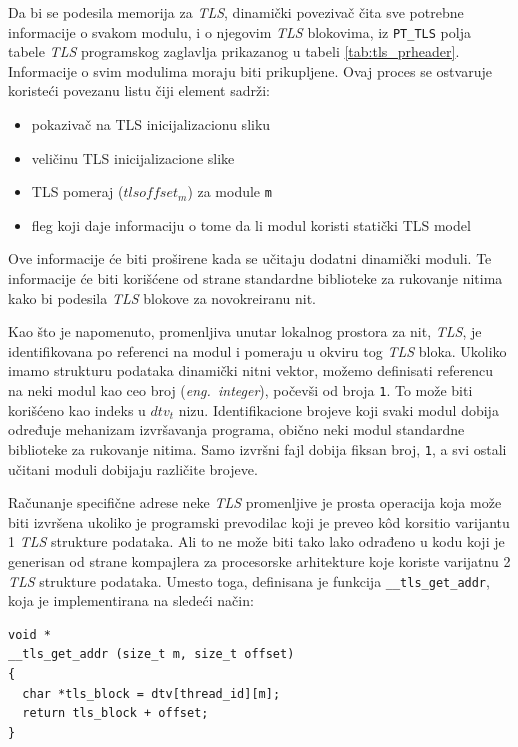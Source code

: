 \documentclass[12pt,oneside]{memoir}
\begin{document}
Da bi se podesila memorija za \emph{TLS}, dinamički povezivač čita sve potrebne informacije o svakom modulu, i o njegovim \emph{TLS} blokovima, iz \texttt{PT\_TLS} polja tabele \emph{TLS} programskog zaglavlja prikazanog u tabeli \ref{tab:tls_prheader}. Informacije o svim modulima moraju biti prikupljene. Ovaj proces se ostvaruje koristeći povezanu listu čiji element sadrži:

\begin{itemize}
	\item pokazivač na TLS inicijalizacionu sliku
	\item veličinu TLS inicijalizacione slike
	\item TLS pomeraj (\texttt{$tlsoffset_m$}) za module \texttt{m}
	\item fleg koji daje informaciju o tome da li modul koristi statički TLS model
\end{itemize}

Ove informacije će biti proširene kada se učitaju dodatni dinamički moduli. Te informacije će biti korišćene od strane standardne biblioteke za rukovanje nitima kako bi podesila \emph{TLS} blokove za novokreiranu nit.

Kao što je napomenuto, promenljiva unutar lokalnog prostora za nit, \emph{TLS}, je identifikovana po referenci na modul i pomeraju u okviru tog \emph{TLS} bloka. Ukoliko imamo strukturu podataka dinamički nitni vektor, možemo definisati referencu na neki modul kao ceo broj (\emph{eng.~integer}), počevši od broja \texttt{1}. To može biti korišćeno kao indeks u \texttt{$dtv_t$} nizu. Identifikacione brojeve koji svaki modul dobija određuje mehanizam izvršavanja programa, obično neki modul standardne biblioteke za rukovanje nitima. Samo izvršni fajl dobija fiksan broj, \texttt{1}, a svi ostali učitani moduli dobijaju različite brojeve.

Računanje specifične adrese neke \emph{TLS} promenljive je prosta operacija koja može biti izvršena ukoliko je programski prevodilac koji je preveo k\^{o}d korsitio varijantu 1 \emph{TLS} strukture podataka. Ali to ne može biti tako lako odrađeno u kodu koji je generisan od strane kompajlera za procesorske arhitekture koje koriste varijatnu 2 \emph{TLS} strukture podataka.
Umesto toga, definisana je funkcija \texttt{\_\_tls\_get\_addr}, koja je implementirana na sledeći način:

\begin{lstlisting}[style=customc]
void *
__tls_get_addr (size_t m, size_t offset)
{
  char *tls_block = dtv[thread_id][m];
  return tls_block + offset;
}

\end{lstlisting}
\end{document}
